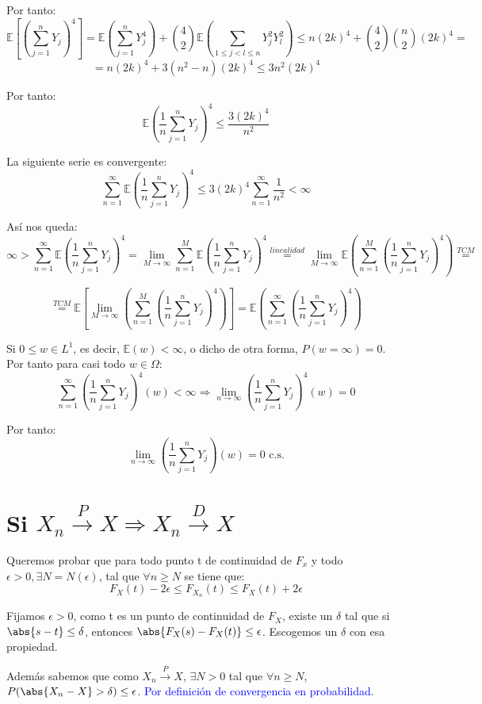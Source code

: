 \documentclass{apuntes}
\begin{document}
Por tanto:
\[
\mathbb{E}\left[(\sum_{j=1}^{n} Y_j)^4\right]= \mathbb{E}(\sum_{j=1}^{n} Y_j^4) + \binom{4}{2}\mathbb{E}(\sum_{1\leq j<l\leq n} Y_j^2 Y_l^2)\leq n(2k)^4 + \binom{4}{2}\binom{n}{2}(2k)^4 =
\]
\[
= n(2k)^4+3(n^2-n)(2k)^4 \leq 3n^2(2k)^4
\]

Por tanto:
\[
\mathbb{E}(\frac{1}{n}\sum_{j=1}^{n}Y_j)^4 \leq \frac{3(2k)^4}{n^2}
\]

La siguiente serie es convergente:
\[
\sum_{n=1}^{\infty}\mathbb{E}(\frac{1}{n}\sum_{j=1}^{n}Y_j)^4 \leq 3(2k)^4 \sum_{n=1}^{\infty}\frac{1}{n^2} < \infty
\]

Así nos queda:
\[
\infty > \sum_{n=1}^{\infty}\mathbb{E}(\frac{1}{n}\sum_{j=1}^{n}Y_j)^4 = \lim_{M \rightarrow \infty}\sum_{n=1}^{M}\mathbb{E}(\frac{1}{n}\sum_{j=1}^{n}Y_j)^4 \stackrel{linealidad}{=} \lim_{M \rightarrow \infty} \mathbb{E}\left(\sum_{n=1}^{M}(\frac{1}{n}\sum_{j=1}^{n}Y_j)^4 \right) \stackrel{TCM}{=}
\]

\[
\stackrel{TCM}{=} \mathbb{E}\left[\lim_{M \rightarrow \infty}\left(\sum_{n=1}^{M}(\frac{1}{n}\sum_{j=1}^{n} Y_j)^4 \right)  \right] = \mathbb{E}\left(\sum_{n=1}^{\infty}(\frac{1}{n}\sum_{j=1}^{n} Y_j)^4 \right)
\]

Si $0 \leq w \in L^1$, es decir, $\mathbb{E}(w) < \infty$, o dicho de otra forma, $P(w = \infty)=0$. Por tanto para casi todo $w \in \Omega$:
\[
\sum_{n=1}^{\infty}(\frac{1}{n}\sum_{j=1}^{n}Y_j)^4 (w) < \infty  \Rightarrow \lim_{n \rightarrow \infty}(\frac{1}{n}\sum_{j=1}^{n}Y_j)^4 (w) = 0
\]

Por tanto:
\[
\lim_{n \rightarrow \infty}(\frac{1}{n}\sum_{j=1}^{n}Y_j) (w) = 0 \text{ c.s.}
\]

\section{Si $X_n \stackrel{P}{\rightarrow} X  \Rightarrow X_n \stackrel{D}{\rightarrow} X$}
Queremos probar que para todo punto t de continuidad de $F_x$ y todo $\epsilon >0, \exists N=N(\epsilon)$, tal que $\forall n \geq N$ se tiene que:
\[
F_X(t)-2\epsilon \leq F_{X_n}(t) \leq F_X(t)+2\epsilon
\]

Fijamos $\epsilon>0$, como t es un punto de continuidad de $F_X$, existe un $\delta$ tal que si $\abs{s-t}\leq \delta$, entonces $\abs{F_X(s)-F_X(t)} \leq \epsilon$. Escogemos un $\delta$ con esa propiedad.

Además sabemos que como $X_n \stackrel{P}{\rightarrow} X$, $\exists N>0$ tal que $\forall n \geq N$, $P(\abs{X_n -X}>\delta)\leq \epsilon$. \textcolor{blue}{Por definición de convergencia en probabilidad}.
\end{document}

